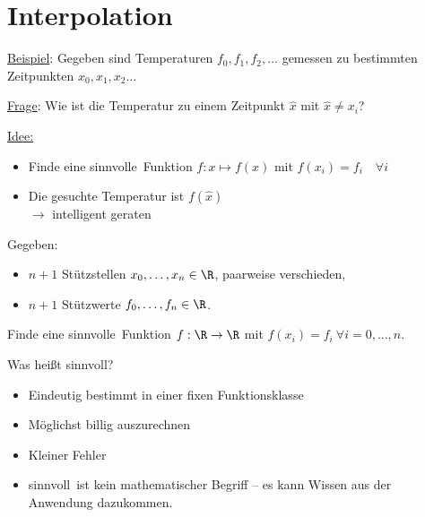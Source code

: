\chapter{Interpolation}

\underline{Beispiel}: Gegeben sind Temperaturen $f_0, f_1, f_2, \hdots$ gemessen zu bestimmten Zeitpunkten $x_0,x_1,x_2\hdots$

\bigskip

\underline{Frage}: Wie ist die Temperatur zu einem Zeitpunkt $\hat x$ mit $\hat x\neq x_i$?

\begin{center}
\end{center}

\underline{Idee:} \begin{itemize}
                   \item  Finde eine \glqq sinnvolle\grqq~Funktion $f: x\mapsto f(x)$ mit $f(x_i)=f_i\quad \forall i$
                    \item Die gesuchte Temperatur ist $f(\hat x)$\\
                    $\rightarrow$ \glqq intelligent geraten\grqq
                  \end{itemize}

\bigskip

\begin{definition}[Interpolationsproblem]
 Gegeben:
 \begin{itemize}
  \item $n+1$ Stützstellen $x_0,\hdots,x_n\in\R$, paarweise verschieden,
  \item $n+1$ Stützwerte $f_0,\hdots,f_n\in\R$.
 \end{itemize}
Finde eine \glqq sinnvolle\grqq~Funktion $f:\R\to\R$ mit $f(x_i)=f_i\ \forall i=0,\hdots,n$.
\end{definition}


Was heißt \glqq sinnvoll\grqq ?
\begin{itemize}
 \item Eindeutig bestimmt in einer fixen Funktionsklasse
 \item Möglichst billig auszurechnen
 \item Kleiner Fehler
 \item \glqq sinnvoll\grqq~ist kein mathematischer Begriff -- es kann Wissen aus der Anwendung dazukommen.
\end{itemize}

